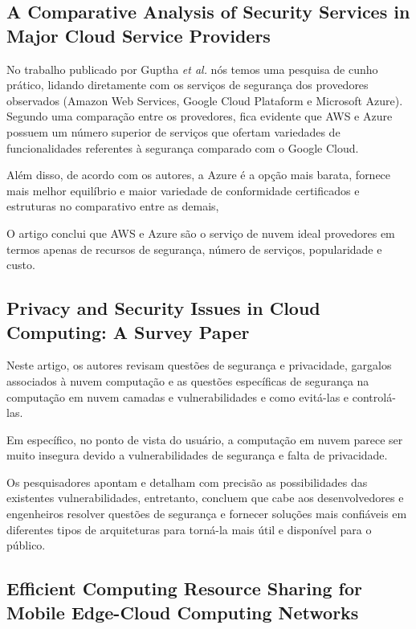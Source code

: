 \documentclass[12pt]{article}
\begin{document}
\subsection{A Comparative Analysis of Security Services in Major Cloud Service Providers \cite{guptha}}

No trabalho publicado por Guptha \emph{et al.} nós temos uma pesquisa de cunho prático, lidando diretamente com os serviços de segurança dos provedores observados (Amazon Web Services, Google Cloud Plataform e Microsoft Azure). Segundo uma comparação entre os provedores, fica evidente que AWS e Azure possuem um número superior de serviços que ofertam variedades de funcionalidades referentes à segurança comparado com o Google Cloud.

Além disso, de acordo com os autores, a Azure é a opção mais barata, fornece mais melhor equilíbrio e maior variedade de conformidade
certificados e estruturas no comparativo entre as demais, 

O artigo conclui que AWS e Azure são o serviço de nuvem ideal provedores em termos apenas de recursos de segurança, número de serviços, popularidade e custo.

\subsection{Privacy and Security Issues in Cloud Computing: A Survey Paper\cite{bamasoud}}

Neste artigo, os autores revisam questões de segurança e privacidade, gargalos associados à nuvem computação e as questões específicas de segurança na computação em nuvem camadas e vulnerabilidades e como evitá-las e controlá-las.

Em específico, no ponto de vista do usuário, a computação em nuvem parece ser muito insegura devido a vulnerabilidades de segurança e falta de privacidade. 

Os pesquisadores apontam e detalham com precisão as possibilidades das existentes vulnerabilidades, entretanto, concluem que cabe aos desenvolvedores e engenheiros resolver
questões de segurança e fornecer soluções mais confiáveis em diferentes tipos de arquiteturas para torná-la mais útil e disponível para o público.

\subsection{Efficient Computing Resource Sharing for Mobile Edge-Cloud Computing Networks\cite{zhang}}
\end{document}
